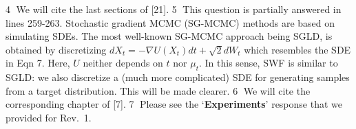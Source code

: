 \documentclass{article}
\newcommand{\rev}[1]{{\color{red} #1}}
\newcommand{\umut}[1]{{\color{blue} #1}}
\newcommand{\alain}[1]{{\color{cyan} #1}}
\newcommand{\antoine}[1]{{\color{orange} #1}}
\newcommand{\ubul}[1]{{\large \color{red} \textcircled{\small #1}}}
\begin{document}
%
\ubul{4} We will cite the last sections of [21]. %
%
%
%
\ubul{5} This question is partially answered in lines 259-263. Stochastic gradient MCMC (SG-MCMC) methods are based on simulating SDEs. The most well-known SG-MCMC approach being SGLD, is obtained by discretizing $d X_t = - \nabla U(X_t) dt + \sqrt{2} dW_t$ which resembles the SDE in Eqn 7. Here, $U$ neither depends on $t$ nor $\mu_t$. In this sense, SWF is similar to SGLD: we also discretize a (much more complicated) SDE for generating samples from a target distribution. This will be made clearer.
%
%
\ubul{6} We will cite the corresponding chapter of [7]. %
%
%
%
\ubul{7} Please see the `\textbf{Experiments}' response that we provided for Rev.\ 1.
\end{document}
